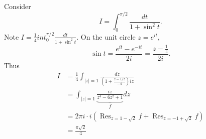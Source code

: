 \documentclass[a4paper]{article}
\DeclareMathOperator*{\res}{Res}
\begin{document}
\begin{eg}
  Consider
  \[
    I = \int_0^{\pi/2} \frac{dt}{1 + \sin^2 t}.
  \]
  Note \(I = \frac{1}{4} int_0^{\pi/2} \frac{dt}{1 + \sin^2 t}\). On the unit circle \(z = e^{it}\),
  \[
    \sin t = \frac{e^{it} - e^{-it}}{2i} = \frac{z - \frac{1}{z}}{2i}.
  \]
  Thus
  \begin{align*}
    I
    &= \frac{1}{4} \int_{|z| = 1} \frac{dz}{(1 + \frac{z - 1/z}{-4})iz} \\
    &= \int_{|z| = 1} \underbrace{\frac{iz}{z^4 - 6z^2 + 1}}_f dz \\
    &= 2\pi i \cdot i (\res_{z = 1 - \sqrt 2} f + \res_{z = -1 + \sqrt 2} f) \\
    &= \frac{\pi\sqrt 2}{4}
  \end{align*}
\end{eg}



\printindex

\iffalse
past lecture notes:
T. Scholl, K. Carne

Book
Ahlfors, Complex Analysis
\fi
\end{document}
